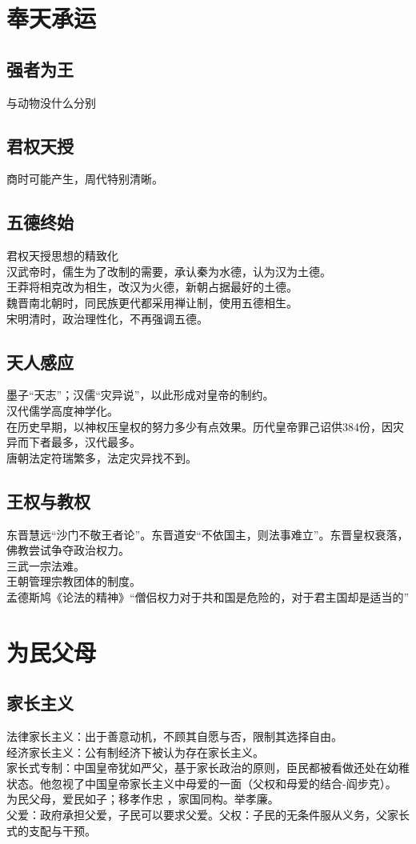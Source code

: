 \documentclass[twoside]{article}
\begin{document}
\section{奉天承运}
\subsection{强者为王}
与动物没什么分别
\subsection{君权天授}
商时可能产生，周代特别清晰。\\
\subsection{五德终始}
君权天授思想的精致化\\
汉武帝时，儒生为了改制的需要，承认秦为水德，认为汉为土德。\\
王莽将相克改为相生，改汉为火德，新朝占据最好的土德。\\
魏晋南北朝时，同民族更代都采用禅让制，使用五德相生。\\
宋明清时，政治理性化，不再强调五德。
\subsection{天人感应}
墨子``天志''；汉儒``灾异说''，以此形成对皇帝的制约。\\
汉代儒学高度神学化。\\
在历史早期，以神权压皇权的努力多少有点效果。历代皇帝罪己诏供384份，因灾异而下者最多，汉代最多。\\
唐朝法定符瑞繁多，法定灾异找不到。\\
\subsection{王权与教权}
东晋慧远``沙门不敬王者论''。东晋道安``不依国主，则法事难立''。东晋皇权衰落，佛教尝试争夺政治权力。\\
三武一宗法难。\\
王朝管理宗教团体的制度。\\
孟德斯鸠《论法的精神》``僧侣权力对于共和国是危险的，对于君主国却是适当的''
\section{为民父母}
\subsection{家长主义}
法律家长主义：出于善意动机，不顾其自愿与否，限制其选择自由。\\
经济家长主义：公有制经济下被认为存在家长主义。\\
家长式专制：中国皇帝犹如严父，基于家长政治的原则，臣民都被看做还处在幼稚状态。他忽视了中国皇帝家长主义中母爱的一面（父权和母爱的结合-阎步克）。\\
为民父母，爱民如子；移孝作忠 ，家国同构。举孝廉。\\
父爱：政府承担父爱，子民可以要求父爱。父权：子民的无条件服从义务，父家长式的支配与干预。\\
\end{document}

